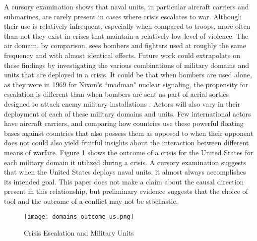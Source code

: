 \documentclass[12pt,letterpaper]{article}
\begin{document}
A cursory examination shows that naval units, in particular aircraft carriers and submarines, are rarely present in cases where crisis escalates to war. Although their use is relatively infrequent, especially when compared to troops, more often than not they exist in crises that maintain a relatively low level of violence.  The air domain, by comparison, sees bombers and fighters used at roughly the same frequency and with almost identical effects. Future work could extrapolate on these findings by investigating the various combinations of military domains and units that are deployed in a crisis. It could be that when bombers are used alone, as they were in 1969 for Nixon's ``madman" nuclear signaling, the propensity for escalation is different than when bombers are sent as part of aerial sorties designed to attack enemy military installations \citep{sagan_madman_2003}. Actors will also vary in their deployment of each of these military domains and units. Few international actors have aircraft carriers, and comparing how countries use these powerful floating bases against countries that also possess them as opposed to when their opponent does not could also yield fruitful insights about the interaction between different means of warfare. Figure \ref{fig:app_outcome_us} shows the outcome of a crisis for the United States for each military domain it utilized during a crisis. A cursory examination suggests that when the United States deploys naval units, it almost always accomplishes its intended goal. This paper does not make a claim about the causal direction present in this relationship, but preliminary evidence suggests that the choice of tool and the outcome of a conflict may not be stochastic.

\begin{figure}[H]
	\centering
	\texttt{[image: domains\_outcome\_us.png]}
	\caption{Crisis Escalation and Military Units}
	\label{fig:app_outcome_us}
\end{figure}
\end{document}
